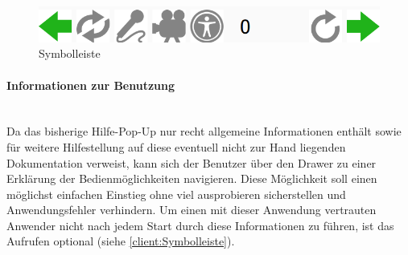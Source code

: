 \begin{figure}[ht!]
	\centering
	\includegraphics[scale=0.5]{GUI/Bilder/SchnellLeiste.PNG}
	\caption{Symbolleiste{\tiny}}
	\label{client:Symbolleiste}
\end{figure}

\paragraph{Informationen zur Benutzung}$\;$\\
Da das bisherige Hilfe-Pop-Up nur recht allgemeine Informationen enthält sowie für weitere Hilfestellung auf diese eventuell nicht zur Hand liegenden Dokumentation verweist, kann sich der Benutzer über den Drawer zu einer Erklärung der Bedienmöglichkeiten navigieren. Diese Möglichkeit soll einen möglichst einfachen Einstieg ohne viel ausprobieren sicherstellen und Anwendungsfehler verhindern. Um einen mit dieser Anwendung vertrauten Anwender nicht nach jedem Start durch diese Informationen zu führen, ist das Aufrufen optional (siehe \autoref{client:Symbolleiste}).

